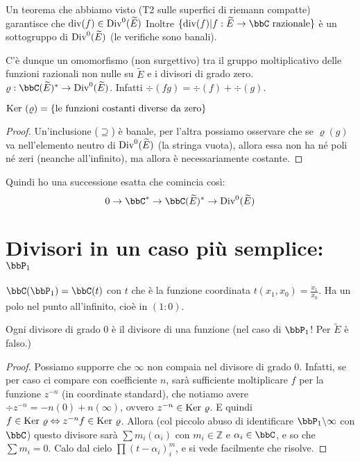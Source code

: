 Un teorema che abbiamo visto (T2 sulle superfici di riemann compatte) garantisce che $\mbox{div}(f) \in \mbox{Div}^0(\widetilde{E})$
Inoltre $\{\div(f) | f: \widetilde{E} \rar \bbC \mbox{ razionale} \}$ è un sottogruppo di $\mbox{Div}^0(\widetilde{E})$ (le verifiche sono banali).

C'è dunque un omomorfismo (non surgettivo) tra il gruppo moltiplicativo delle funzioni razionali non nulle su $\widetilde{E}$ e i divisori di grado zero.
$\varrho: \bbC(\widetilde E)^* \rightarrow \Div^0(\widetilde{E})$. Infatti $\div(fg)=\div(f)+\div(g)$.

\begin{proposizione}
$\mbox{Ker }(\varrho) = \{\text{le funzioni costanti diverse da zero}\}$
\end{proposizione}
\begin{proof}
Un'inclusione ($\supseteq$) è banale, per l'altra possiamo osservare che se $\varrho(g)$ va nell'elemento
neutro di $\mbox{Div}^0(\widetilde{E})$ (la stringa vuota), allora essa non ha né poli né zeri (neanche all'infinito), ma allora è necessariamente costante.
\end{proof}

\begin{osservazione}
Quindi ho una successione esatta che comincia così:
$$0 \rightarrow \bbC^* \rightarrow \bbC(\widetilde{E})^* \rightarrow \Div^0(\widetilde{E})$$
\end{osservazione}


\section{Divisori in un caso più semplice: $\bbP_1$}
$\bbC(\bbP_1) = \bbC(t)$ con $t$ che è la funzione coordinata $t(x_1, x_0)=\frac{x_1}{x_0}$.
Ha un polo nel punto all'infinito, cioè in $(1:0)$.

\begin{proposizione}
Ogni divisore di grado $0$ è il divisore di una funzione (nel caso di $\bbP_1$! Per $\widetilde E$ è falso.)
\end{proposizione}
\begin{proof}
  Possiamo supporre che $\infty$ non compaia nel divisore di grado $0$.
  Infatti, se per caso ci compare con coefficiente $n$, sarà sufficiente moltiplicare $f$ per la funzione $z^{-n}$ (in coordinate standard), che notiamo avere $\div z^{-n} = -n (0) + n (\infty)$, ovvero $z^{-n} \in \mbox{Ker } \varrho$. E quindi $f \in \mbox{Ker } \varrho \Leftrightarrow z^{-n} f \in \mbox{Ker } \varrho$.
Allora (col piccolo abuso di identificare $\bbP_1 \backslash \infty$ con $\bbC$)
questo divisore sarà $\sum m_i (\alpha_i)$ con $m_i \in \mathbb{Z}$ e $\alpha_i \in \bbC$, e so che $\sum m_i=0$.
Calo dal cielo $\prod(t-\alpha_i)^m_i$, e si vede facilmente che risolve.
\end{proof}

